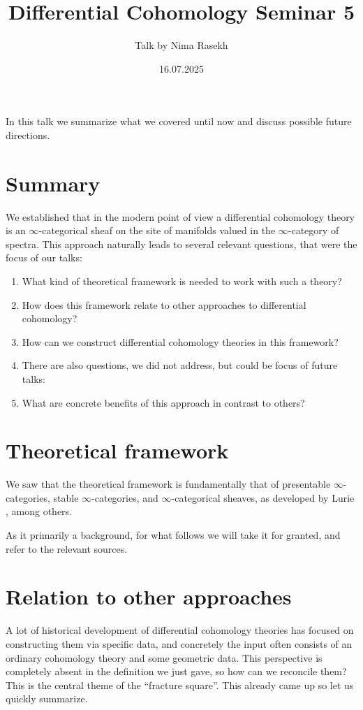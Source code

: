 \documentclass[10pt]{amsart}
\title{Differential Cohomology Seminar 5}
\date{16.07.2025}
\author{Talk by Nima Rasekh}
\theoremstyle{definition}
\theoremstyle{remark}
\numberwithin{equation}{section}
\begin{document}
\maketitle

In this talk we summarize what we covered until now and discuss possible future directions.

\section {Summary}
We established that in the modern point of view a differential cohomology theory is an $\infty$-categorical sheaf on the site of manifolds valued in the $\infty$-category of spectra. This approach naturally leads to several relevant questions, that were the focus of our talks:
\begin{enumerate}
  \item What kind of theoretical framework is needed to work with such a theory?
  \item How does this framework relate to other approaches to differential cohomology?
  \item How can we construct differential cohomology theories in this framework?
  \item[] There are also questions, we did not address, but could be focus of future talks:
  \item What are concrete benefits of this approach in contrast to others?
\end{enumerate} 

\section{Theoretical framework}
We saw that the theoretical framework is fundamentally that of presentable $\infty$-categories, stable $\infty$-categories, and $\infty$-categorical sheaves, as developed by Lurie \cite{lurie2009htt}, among others. 

As it primarily a background, for what follows we will take it for granted, and refer to the relevant sources.

\section{Relation to other approaches}
A lot of historical development of differential cohomology theories has focused on constructing them via specific data, and concretely the input often consists of an ordinary cohomology theory and some geometric data. This perspective is completely absent in the definition we just gave, so how can we reconcile them? This is the central theme of the ``fracture square''. This already came up so let us quickly summarize.
\end{document}
